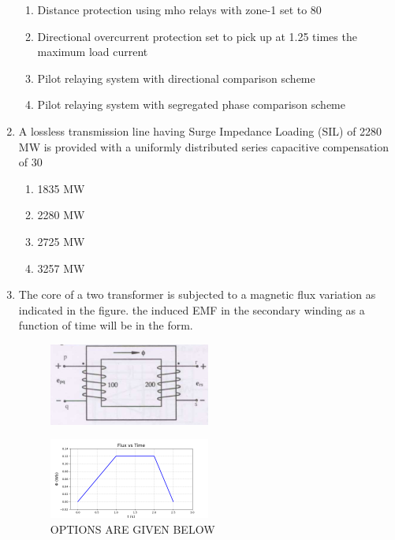 \documentclass{article}
\begin{document}
\begin{enumerate}
        \begin{enumerate}
            \item Distance protection using mho relays with zone-1 set to 80%
            \item Directional overcurrent protection set to pick up at 1.25 times the maximum load current
            \item Pilot relaying system with directional comparison scheme
            \item Pilot relaying system with segregated phase comparison scheme
        \end{enumerate}

    \item A lossless transmission line having Surge Impedance Loading (SIL) of 2280 MW is provided with a uniformly distributed series capacitive compensation of  
 30 %

        \begin{enumerate}
            \item 1835 MW
            \item 2280 MW
            \item 2725 MW
            \item 3257 MW
        \end{enumerate}       


     \item The core of a two transformer is subjected to a magnetic flux variation as indicated in the figure. the induced EMF in the secondary winding as a function of time will be in the form.

   \begin{figure}[h!]
    \centering
      \hspace{-1cm}
      \includegraphics[width=0.5\textwidth]{Screenshot from 2024-10-26 12-11-33.png}
      
      \label{fig:your_label}
    \end{figure}

    \begin{figure}[h!]
    \centering
      \hspace{-1cm}
      \includegraphics[width=0.5\textwidth]{Figure_4.png}
      \caption{OPTIONS ARE GIVEN BELOW}
      \label{fig:your_label}
    \end{figure}



\end{enumerate}
\end{document}
